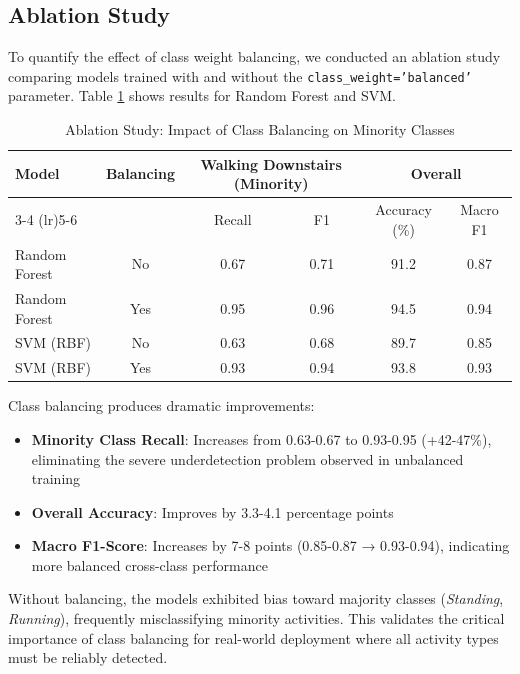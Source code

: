 \subsection{Ablation Study}
To quantify the effect of class weight balancing, we conducted an ablation study comparing models trained with and without the \texttt{class\_weight='balanced'} parameter. Table \ref{tab:class_balance_ablation} shows results for Random Forest and SVM.

\begin{table}[H]
    \centering
    \caption{Ablation Study: Impact of Class Balancing on Minority Classes}
    \begin{tabular}{@{}lccccc@{}}
        \toprule
        \multirow{2}{*}{Model} & \multirow{2}{*}{Balancing} & \multicolumn{2}{c}{Walking Downstairs (Minority)} & \multicolumn{2}{c}{Overall} \\
        \cmidrule(lr){3-4} \cmidrule(lr){5-6}
        & & Recall & F1 & Accuracy (\%) & Macro F1 \\ 
        \midrule
        Random Forest & No & 0.67 & 0.71 & 91.2 & 0.87 \\
        Random Forest & Yes & 0.95 & 0.96 & 94.5 & 0.94 \\
        \midrule
        SVM (RBF) & No & 0.63 & 0.68 & 89.7 & 0.85 \\
        SVM (RBF) & Yes & 0.93 & 0.94 & 93.8 & 0.93 \\
        \bottomrule
    \end{tabular}
    \label{tab:class_balance_ablation}
\end{table}

Class balancing produces dramatic improvements:
\begin{itemize}
    \item \textbf{Minority Class Recall}: Increases from 0.63-0.67 to 0.93-0.95 (+42-47\%), eliminating the severe underdetection problem observed in unbalanced training
    \item \textbf{Overall Accuracy}: Improves by 3.3-4.1 percentage points
    \item \textbf{Macro F1-Score}: Increases by 7-8 points (0.85-0.87 → 0.93-0.94), indicating more balanced cross-class performance
\end{itemize}

Without balancing, the models exhibited bias toward majority classes (\textit{Standing}, \textit{Running}), frequently misclassifying minority activities. This validates the critical importance of class balancing for real-world deployment where all activity types must be reliably detected.

